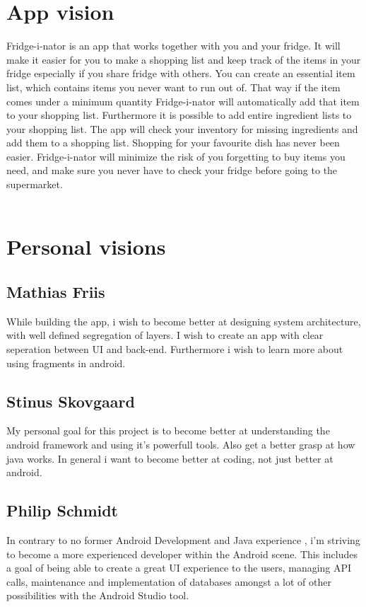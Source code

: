 \documentclass[12pt]{article}
\begin{document}
\section{App vision}
Fridge-i-nator is an app that works together with you and your fridge. It will make it easier for you to make a shopping
list and keep track of the items in your fridge especially if you share fridge with others. You can create an essential
item list, which contains items you never want to run out of. That way if the item comes under a minimum quantity Fridge-i-nator
will automatically add that item to your shopping list. Furthermore it is possible to add entire ingredient lists to your shopping list. The app will check your inventory for missing ingredients and add them to a shopping list. Shopping for your favourite dish has never been easier.
Fridge-i-nator will minimize the risk of you forgetting to buy items you need, and make sure you never have to check your fridge before going to the supermarket.
\\
\\

\section{Personal visions}

\subsection{Mathias Friis}
While building the app, i wish to become better at designing system architecture, with well defined segregation of layers. I wish to create an app with clear seperation between UI and back-end.
Furthermore i wish to learn more about using fragments in android.

\subsection{Stinus Skovgaard}
My personal goal for this project is to become better at understanding the android framework and using it's powerfull tools. Also get a better grasp at how java works. In general i want to become better at coding, not just better at android.

\subsection{Philip Schmidt}
In contrary to no former Android Development and Java experience , i'm striving to become a more experienced developer within the Android scene.
This includes a goal of being able to create a great UI experience to the users, managing API calls, maintenance and implementation of databases amongst a lot of other possibilities with the Android Studio tool.
\end{document}
